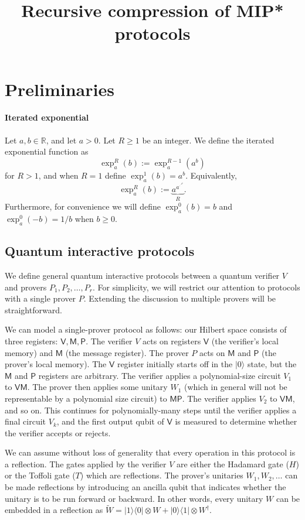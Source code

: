 \documentclass[11pt,letterpaper]{article}
\title{Recursive compression of MIP* protocols}
\date{}
\newcommand{\wt}[1]{\widetilde{#1}}
\newcommand{\ket}[1]{|#1\rangle}
\newcommand{\ketbra}[2]{|#1\rangle\! \langle #2|}
\newcommand{\sP}{{\mathsf{P}}}
\newcommand{\sV}{{\mathsf{V}}}
\newcommand{\sM}{{\mathsf{M}}}
\begin{document}
\maketitle


\section{Preliminaries}



\paragraph{Iterated exponential}
Let $a,b \in \mathbb{R}$, and let $a > 0$. Let $R \geq 1$ be an integer. We define the iterated exponential function as
\[
	\exp^R_a(b) := \exp^{R-1}_a(a^b)
\]
for $R > 1$, and when $R=1$ define $\exp^1_a(b) = a^b$. Equivalently, 
\[
	\exp^R_a(b) := \underbrace{a^{a^{\cdot^{\cdot^{a^b}}}}}_{R}.
\]
Furthermore, for convenience we will define $\exp^0_a(b) = b$ and $\exp^0_a(-b) = 1/b$ when $b \geq 0$.


\subsection{Quantum interactive protocols} 

We define general quantum interactive protocols between a quantum verifier $V$ and provers $P_1,P_2,\ldots,P_r$. For simplicity, we will restrict our attention to protocols with a single prover $P$. Extending the discussion to multiple provers will be straightforward. 

We can model a single-prover protocol as follows: our Hilbert space consists of three registers: $\sV, \sM, \sP$. The verifier $V$ acts on registers $\sV$ (the verifier's local memory) and $\sM$ (the message register). The prover $P$ acts on $\sM$ and $\sP$ (the prover's local memory). The $\sV$ register initially starts off in the $\ket{0}$ state, but the $\sM$ and $\sP$ registers are arbitrary. The verifier applies a polynomial-size circuit $V_1$ to $\sV \sM$. The prover then applies some unitary $W_1$ (which in general will not be representable by a polynomial size circuit) to $\sM \sP$. The verifier applies $V_2$ to $\sV \sM$, and so on. This continues for polynomially-many steps until the verifier applies a final circuit $V_k$, and the first output qubit of $\sV$ is measured to determine whether the verifier accepts or rejects.


We can assume without loss of generality that every operation in this protocol is a reflection. The gates applied by the verifier $V$ are either the Hadamard gate ($H$) or the Toffoli gate ($T$) which are reflections. The prover's unitaries $W_1, W_2,\ldots$ can be made reflections by introducing an ancilla qubit that indicates whether the unitary is to be run forward or backward. In other words, every unitary $W$ can be embedded in a reflection as $\wt{W} = \ketbra{1}{0} \otimes W + \ketbra{0}{1} \otimes W^\dagger$. 
\end{document}

